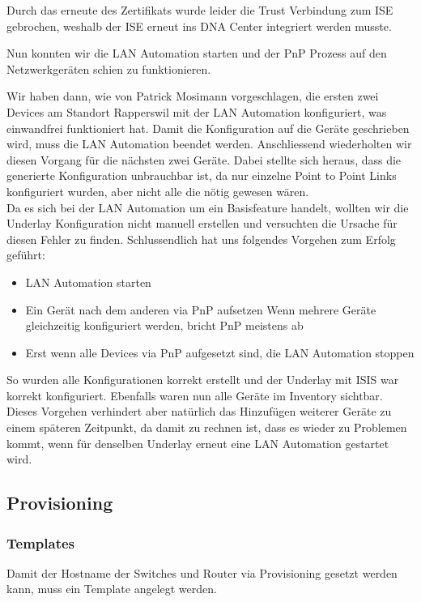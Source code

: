 Durch das erneute des Zertifikats wurde leider die Trust Verbindung zum ISE gebrochen, weshalb der ISE erneut ins DNA Center integriert werden musste. 

Nun konnten wir die LAN Automation starten und der PnP Prozess auf den Netzwerkgeräten schien zu funktionieren. 

Wir haben dann, wie von Patrick Mosimann vorgeschlagen, die ersten zwei Devices am Standort Rapperswil mit der LAN Automation konfiguriert, was einwandfrei funktioniert hat. Damit die Konfiguration auf die Geräte geschrieben wird, muss die LAN Automation beendet werden. Anschliessend wiederholten wir diesen Vorgang für die nächsten zwei Geräte. Dabei stellte sich heraus, dass die generierte Konfiguration unbrauchbar ist, da nur einzelne Point to Point Links konfiguriert wurden, aber nicht alle die nötig gewesen wären. \\
Da es sich bei der LAN Automation um ein Basisfeature handelt, wollten wir die Underlay Konfiguration nicht manuell erstellen und versuchten die Ursache für diesen Fehler zu finden. Schlussendlich hat uns folgendes Vorgehen zum Erfolg geführt:
\begin{itemize}
	\item LAN Automation starten
	\item Ein Gerät nach dem anderen via PnP aufsetzen
		\subitem Wenn mehrere Geräte gleichzeitig konfiguriert werden, bricht PnP meistens ab
	\item Erst wenn alle Devices via PnP aufgesetzt sind, die LAN Automation stoppen
\end{itemize}
So wurden alle Konfigurationen korrekt erstellt und der Underlay mit ISIS war korrekt konfiguriert. Ebenfalls waren nun alle Geräte im Inventory sichtbar.\\ 
Dieses Vorgehen verhindert aber natürlich das Hinzufügen weiterer Geräte zu einem späteren Zeitpunkt, da damit zu rechnen ist, dass es wieder zu Problemen kommt, wenn für denselben Underlay erneut eine LAN Automation gestartet wird.


\subsection{Provisioning}

\subsubsection{Templates}
\label{Script-Template}
Damit der Hostname der Switches und Router via Provisioning gesetzt werden kann, muss ein Template angelegt werden.


